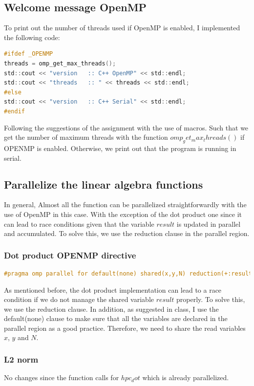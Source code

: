 \documentclass[unicode,11pt,a4paper,oneside,numbers=endperiod,openany]{scrartcl}
\begin{document}
\subsection{Welcome message OpenMP}
To print out the number of threads used if OpenMP is enabled, I implemented the following code:
\begin{lstlisting}[language=C]
#ifdef _OPENMP
threads = omp_get_max_threads();
std::cout << "version   :: C++ OpenMP" << std::endl;
std::cout << "threads   :: " << threads << std::endl;
#else
std::cout << "version   :: C++ Serial" << std::endl;
#endif
\end{lstlisting}
Following the suggestions of the assignment with the use of macros.
Such that we get the number of maximum threads with the function $omp_get_max_threads()$ if
OPENMP is enabled. Otherwise, we print out that the program is running in serial.

\subsection{Parallelize the linear algebra functions}
In general, Almost all the function can be parallelized straightforwardly with the use of OpenMP in
this case. With the exception of the dot product one since it can lead to race conditions given that the 
variable $result$ is updated in parallel and accumulated. To solve this, we use the reduction clause in the 
parallel region.

\subsubsection{Dot product OPENMP directive}
\begin{lstlisting}[language=C]
#pragma omp parallel for default(none) shared(x,y,N) reduction(+:result)
\end{lstlisting}
As mentioned before, the dot product implementation can lead to a race condition
if we do not manage the shared variable $result$ properly. To solve this, we use the reduction clause.
In addition, as suggested in class, I use the default(none) clause to make sure that all the variables are
declared in the parallel region as a good practice. Therefore, we need to share the read variables $x$, $y$ and $N$.

\subsubsection{L2 norm}
No changes since the function calls for $hpc_dot$ which is already parallelized.
\end{document}
